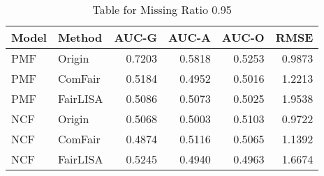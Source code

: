 \begin{table}
\centering
\caption{Table for Missing Ratio 0.95}
\label{tab:missing_0.95}
\begin{tabular}{llrrrr}
\toprule
Model &   Method &  AUC-G &  AUC-A &  AUC-O &   RMSE \\
\midrule
  PMF &   Origin & 0.7203 & 0.5818 & 0.5253 & 0.9873 \\
  PMF &  ComFair & 0.5184 & 0.4952 & 0.5016 & 1.2213 \\
  PMF & FairLISA & 0.5086 & 0.5073 & 0.5025 & 1.9538 \\
  NCF &   Origin & 0.5068 & 0.5003 & 0.5103 & 0.9722 \\
  NCF &  ComFair & 0.4874 & 0.5116 & 0.5065 & 1.1392 \\
  NCF & FairLISA & 0.5245 & 0.4940 & 0.4963 & 1.6674 \\
\bottomrule
\end{tabular}
\end{table}
